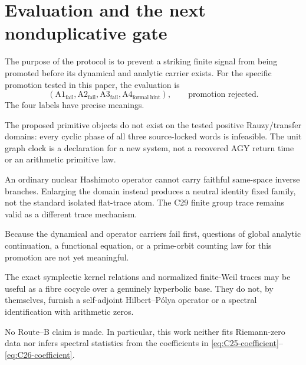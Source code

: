 \section{Evaluation and the next nonduplicative gate}
\label{sec:routea}

The purpose of the \RouteA{} protocol is to prevent a striking finite signal
from being promoted before its dynamical and analytic carrier exists.  For
the specific promotion tested in this paper, the evaluation is
\begin{equation}
 (\mathrm{A1}_{\mathrm{fail}},\mathrm{A2}_{\mathrm{fail}},
  \mathrm{A3}_{\mathrm{fail}},\mathrm{A4}_{\mathrm{formal\ hint}}),
 \qquad
 \boxed{\text{promotion rejected}.}
 \label{eq:route-a-decision}
\end{equation}
The four labels have precise meanings.

\begin{description}[style=nextline,leftmargin=2.4cm]
\item[A1: fail.]
The proposed primitive objects do not exist on the tested positive
Rauzy/transfer domains: every cyclic phase of all three source-locked words is
infeasible.  The unit graph clock is a declaration for a new system, not a
recovered AGY return time or an arithmetic primitive law.

\item[A2: fail.]
An ordinary nuclear Hashimoto operator cannot carry faithful same-space
inverse branches.  Enlarging the domain instead produces a neutral identity
fixed family, not the standard isolated flat-trace atom.  The C29 finite
group trace remains valid as a different trace mechanism.

\item[A3: fail.]
Because the dynamical and operator carriers fail first, questions of global
analytic continuation, a functional equation, or a prime-orbit counting law
for this promotion are not yet meaningful.

\item[A4: formal hint.]
The exact symplectic kernel relations and normalized finite-Weil traces may be
useful as a fibre cocycle over a genuinely hyperbolic base.  They do not, by
themselves, furnish a self-adjoint Hilbert--P\'olya operator or a spectral
identification with arithmetic zeros.
\end{description}

No Route--B claim is made.  In particular, this work neither fits
Riemann-zero data nor infers spectral statistics from the coefficients in
\eqref{eq:C25-coefficient}--\eqref{eq:C26-coefficient}.

